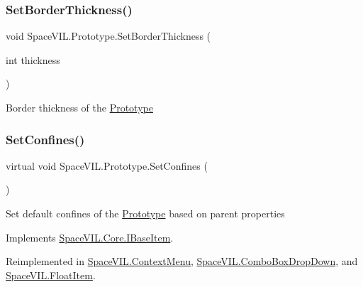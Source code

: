 \subsubsection{\texorpdfstring{Set\+Border\+Thickness()}{SetBorderThickness()}}
{\footnotesize\ttfamily void Space\+V\+I\+L.\+Prototype.\+Set\+Border\+Thickness (\begin{DoxyParamCaption}\item[{int}]{thickness }\end{DoxyParamCaption})}



Border thickness of the \mbox{\hyperlink{class_space_v_i_l_1_1_prototype}{Prototype}} 

\mbox{\label{class_space_v_i_l_1_1_prototype_af063fd80d51a3c42c8f43e0e97b6b809}} 
\subsubsection{\texorpdfstring{Set\+Confines()}{SetConfines()}\hspace{0.1cm}{\footnotesize\ttfamily [1/2]}}
{\footnotesize\ttfamily virtual void Space\+V\+I\+L.\+Prototype.\+Set\+Confines (\begin{DoxyParamCaption}{ }\end{DoxyParamCaption})\hspace{0.3cm}{\ttfamily [virtual]}}



Set default confines of the \mbox{\hyperlink{class_space_v_i_l_1_1_prototype}{Prototype}} based on parent properties 



Implements \mbox{\hyperlink{interface_space_v_i_l_1_1_core_1_1_i_base_item}{Space\+V\+I\+L.\+Core.\+I\+Base\+Item}}.



Reimplemented in \mbox{\hyperlink{class_space_v_i_l_1_1_context_menu_ae8eaad3b3f7858ab1d03f5a18d94e4ca}{Space\+V\+I\+L.\+Context\+Menu}}, \mbox{\hyperlink{class_space_v_i_l_1_1_combo_box_drop_down_a236066889e0b652410d02de2b4cb51c7}{Space\+V\+I\+L.\+Combo\+Box\+Drop\+Down}}, and \mbox{\hyperlink{class_space_v_i_l_1_1_float_item_ada12a95045db04f1a5e196a14f1a8d0f}{Space\+V\+I\+L.\+Float\+Item}}.

